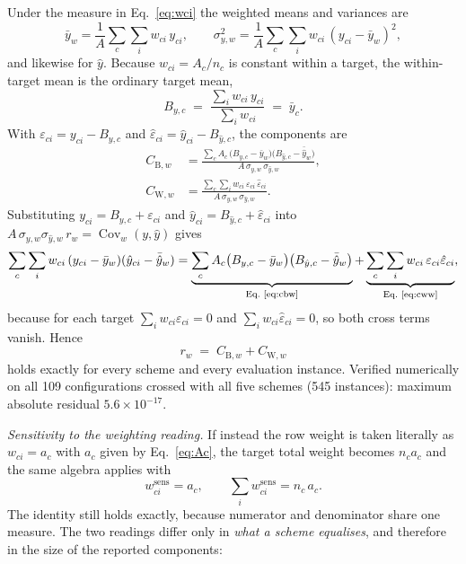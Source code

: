 \documentclass[11pt,a4paper]{article}
\begin{document}
Under the measure in Eq.~\eqref{eq:wci} the weighted means and variances are
\begin{equation}
  \bar{y}_w = \frac{1}{A}\sum_{c}\sum_{i} w_{ci}\, y_{ci}, \qquad
  \sigma^{2}_{y,w} = \frac{1}{A}\sum_{c}\sum_{i} w_{ci}\,(y_{ci} - \bar{y}_w)^{2},
  \label{eq:means}
\end{equation}
and likewise for $\hat{y}$. Because $w_{ci} = A_c/n_c$ is constant within a target, the
within-target mean is the ordinary target mean,
\begin{equation}
  B_{y,c} \;=\; \frac{\sum_i w_{ci}\, y_{ci}}{\sum_i w_{ci}} \;=\; \bar{y}_c .
  \label{eq:byc}
\end{equation}
With $\varepsilon_{ci} = y_{ci} - B_{y,c}$ and
$\hat{\varepsilon}_{ci} = \hat{y}_{ci} - B_{\hat{y},c}$, the components are
\begin{align}
  C_{\mathrm{B},w} &= \frac{\sum_{c} A_c\,
      \bigl(B_{y,c} - \bar{y}_w\bigr)\bigl(B_{\hat{y},c} - \bar{\hat{y}}_w\bigr)}
      {A\,\sigma_{y,w}\,\sigma_{\hat{y},w}}, \label{eq:cbw}\\[4pt]
  C_{\mathrm{W},w} &= \frac{\sum_{c}\sum_{i} w_{ci}\,
      \varepsilon_{ci}\,\hat{\varepsilon}_{ci}}
      {A\,\sigma_{y,w}\,\sigma_{\hat{y},w}}. \label{eq:cww}
\end{align}
Substituting $y_{ci} = B_{y,c} + \varepsilon_{ci}$ and
$\hat{y}_{ci} = B_{\hat{y},c} + \hat{\varepsilon}_{ci}$ into
$A\,\sigma_{y,w}\sigma_{\hat{y},w}\,r_w = \operatorname{Cov}_w(y,\hat{y})$ gives
\begin{equation}
  \sum_{c}\sum_{i} w_{ci}\,(y_{ci} - \bar{y}_w)(\hat{y}_{ci} - \bar{\hat{y}}_w)
  = \underbrace{\sum_{c} A_c
      \bigl(B_{y,c} - \bar{y}_w\bigr)\bigl(B_{\hat{y},c} - \bar{\hat{y}}_w\bigr)}_{
      \text{Eq.~\eqref{eq:cbw}}}
  + \underbrace{\sum_{c}\sum_{i} w_{ci}\,\varepsilon_{ci}\hat{\varepsilon}_{ci}}_{
      \text{Eq.~\eqref{eq:cww}}},
  \label{eq:cross}
\end{equation}
because for each target $\sum_i w_{ci}\varepsilon_{ci} = 0$ and
$\sum_i w_{ci}\hat{\varepsilon}_{ci} = 0$, so both cross terms vanish. Hence
\begin{equation}
  r_w \;=\; C_{\mathrm{B},w} + C_{\mathrm{W},w}
  \label{eq:identity-w}
\end{equation}
holds exactly for every scheme and every evaluation instance. Verified numerically on all 109
configurations crossed with all five schemes (545 instances): maximum absolute residual
$5.6 \times 10^{-17}$.

\emph{Sensitivity to the weighting reading.} If instead the row weight is taken literally as
$w_{ci} = a_c$ with $a_c$ given by Eq.~\eqref{eq:Ac}, the target total weight becomes
$n_c a_c$ and the same algebra applies with
\begin{equation}
  w^{\mathrm{sens}}_{ci} = a_c, \qquad \sum_i w^{\mathrm{sens}}_{ci} = n_c\,a_c .
  \label{eq:sens}
\end{equation}
The identity still holds exactly, because numerator and denominator share one measure. The two
readings differ only in \emph{what a scheme equalises}, and therefore in the size of the
reported components:
\end{document}
